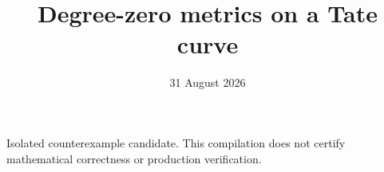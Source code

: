 \documentclass[11pt]{article}
\title{Degree-zero metrics on a Tate curve}
\author{}
\date{31 August 2026}
\begin{document}
\maketitle
\noindent
Isolated counterexample candidate.  This compilation does not certify
mathematical correctness or production verification.




\end{document}
